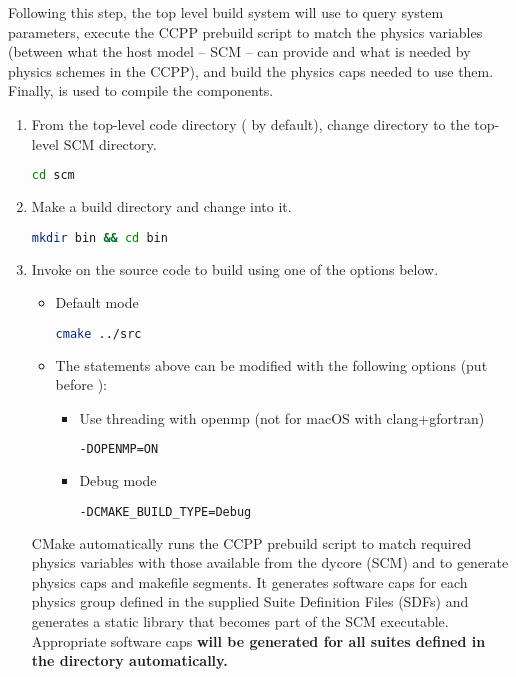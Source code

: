 Following this step, the top level build system will use  to query system parameters, execute the CCPP prebuild script to match the physics variables (between what the host model -- SCM -- can provide and what is needed by physics schemes in the CCPP), and build the physics caps needed to use them. Finally,  is used to compile the components.
\begin{enumerate}
 \item From the top-level code directory ( by default), change directory to the top-level SCM directory.
\begin{lstlisting}[language=bash]
cd scm
\end{lstlisting}
\item Make a build directory and change into it.
\begin{lstlisting}[language=bash]
mkdir bin && cd bin
\end{lstlisting}
\item Invoke  on the source code to build using one of the options below.
\begin{itemize}
\item Default mode
\begin{lstlisting}[language=bash]
cmake ../src
\end{lstlisting}
\item The statements above can be modified with the following options (put before ):
\begin{itemize}
\item Use threading with openmp (not for macOS with clang+gfortran)
\begin{lstlisting}[language=bash]
-DOPENMP=ON
\end{lstlisting}
\item Debug mode
\begin{lstlisting}[language=bash]
-DCMAKE_BUILD_TYPE=Debug
\end{lstlisting}
\end{itemize}
\end{itemize}

CMake automatically runs the CCPP prebuild script to match required physics variables with those available from the dycore (SCM) and to generate physics caps and makefile segments. It generates software caps for each physics group defined in the supplied Suite Definition Files (SDFs) and generates a static library that becomes part of the SCM executable. Appropriate software caps \textbf{will be generated for all suites defined in the  directory automatically.}


\end{enumerate}
